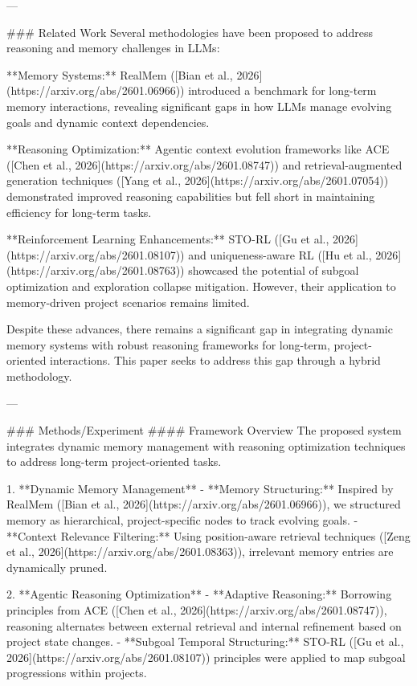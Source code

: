 ---

### Related Work  
Several methodologies have been proposed to address reasoning and memory challenges in LLMs:  

**Memory Systems:** RealMem ([Bian et al., 2026](https://arxiv.org/abs/2601.06966)) introduced a benchmark for long-term memory interactions, revealing significant gaps in how LLMs manage evolving goals and dynamic context dependencies.  

**Reasoning Optimization:** Agentic context evolution frameworks like ACE ([Chen et al., 2026](https://arxiv.org/abs/2601.08747)) and retrieval-augmented generation techniques ([Yang et al., 2026](https://arxiv.org/abs/2601.07054)) demonstrated improved reasoning capabilities but fell short in maintaining efficiency for long-term tasks.  

**Reinforcement Learning Enhancements:** STO-RL ([Gu et al., 2026](https://arxiv.org/abs/2601.08107)) and uniqueness-aware RL ([Hu et al., 2026](https://arxiv.org/abs/2601.08763)) showcased the potential of subgoal optimization and exploration collapse mitigation. However, their application to memory-driven project scenarios remains limited.  

Despite these advances, there remains a significant gap in integrating dynamic memory systems with robust reasoning frameworks for long-term, project-oriented interactions. This paper seeks to address this gap through a hybrid methodology.

---

### Methods/Experiment  
#### Framework Overview  
The proposed system integrates dynamic memory management with reasoning optimization techniques to address long-term project-oriented tasks.  

1. **Dynamic Memory Management**  
   - **Memory Structuring:** Inspired by RealMem ([Bian et al., 2026](https://arxiv.org/abs/2601.06966)), we structured memory as hierarchical, project-specific nodes to track evolving goals.  
   - **Context Relevance Filtering:** Using position-aware retrieval techniques ([Zeng et al., 2026](https://arxiv.org/abs/2601.08363)), irrelevant memory entries are dynamically pruned.  

2. **Agentic Reasoning Optimization**  
   - **Adaptive Reasoning:** Borrowing principles from ACE ([Chen et al., 2026](https://arxiv.org/abs/2601.08747)), reasoning alternates between external retrieval and internal refinement based on project state changes.  
   - **Subgoal Temporal Structuring:** STO-RL ([Gu et al., 2026](https://arxiv.org/abs/2601.08107)) principles were applied to map subgoal progressions within projects.  

